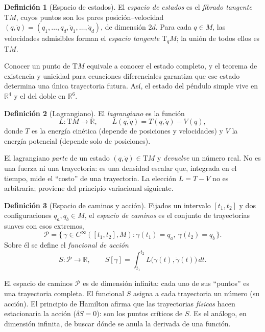 \documentclass[11pt,letterpaper]{article}
\theoremstyle{definition}
\newtheorem{definicion}{Definición}[section]
\theoremstyle{plain}
\theoremstyle{remark}
\newcommand{\R}{\mathbb{R}}
\newcommand{\TM}{\mathrm{T}M}
\begin{document}
\begin{definicion}[Espacio de estados]
\label{def:estados}
El \emph{espacio de estados} es el \emph{fibrado tangente} $\TM$, cuyos
puntos son los pares posición--velocidad
$(q,\dot q)=(q_1,\dots,q_d,\dot q_1,\dots,\dot q_d)$, de dimensión $2d$.
Para cada $q\in M$, las velocidades admisibles forman el \emph{espacio
tangente} $\mathrm{T}_qM$; la unión de todos ellos es $\TM$.
\end{definicion}

Conocer un punto de $\TM$ equivale a conocer el
estado completo, y el teorema de existencia y unicidad para ecuaciones
diferenciales garantiza que ese estado determina una única trayectoria
futura. Así, el estado del péndulo simple vive en $\R^4$ y el del doble
en $\R^6$.

\begin{definicion}[Lagrangiano]
\label{def:lagrangiano}
El \emph{lagrangiano} es la función
\begin{equation}\label{eq:Ldef}
  L:\TM\longrightarrow\R,\qquad L(q,\dot q)=T(q,\dot q)-V(q),
\end{equation}
donde $T$ es la energía cinética (depende de posiciones y velocidades) y
$V$ la energía potencial (depende solo de posiciones).
\end{definicion}

El lagrangiano \emph{parte} de un estado
$(q,\dot q)\in\TM$ y \emph{devuelve} un número real. No es una fuerza ni
una trayectoria: es una densidad escalar que, integrada en el tiempo,
mide el ``costo'' de una trayectoria. La elección $L=T-V$ no es
arbitraria; proviene del principio variacional siguiente.

\begin{definicion}[Espacio de caminos y acción]
\label{def:caminos}
Fijados un intervalo $[t_1,t_2]$ y dos configuraciones $q_a,q_b\in M$, el
\emph{espacio de caminos} es el conjunto de trayectorias suaves con esos
extremos,
\begin{equation}
  \mathcal{P}=\{\,\gamma\in C^{\infty}([t_1,t_2],M):
                \gamma(t_1)=q_a,\ \gamma(t_2)=q_b\,\}.
\end{equation}
Sobre él se define el \emph{funcional de acción}
\begin{equation}\label{eq:accion}
  S:\mathcal{P}\longrightarrow\R,\qquad
  S[\gamma]=\int_{t_1}^{t_2} L\bigl(\gamma(t),\dot\gamma(t)\bigr)\,dt.
\end{equation}
\end{definicion}

El espacio de caminos $\mathcal{P}$ es de dimensión infinita: cada uno de
sus ``puntos'' es una trayectoria completa. El funcional $S$ asigna a
cada trayectoria un número (su acción). El principio de Hamilton afirma
que las trayectorias \emph{físicas} hacen estacionaria la acción
($\delta S=0$): son los puntos críticos de $S$. Es el análogo, en
dimensión infinita, de buscar dónde se anula la derivada de una función.
\end{document}
